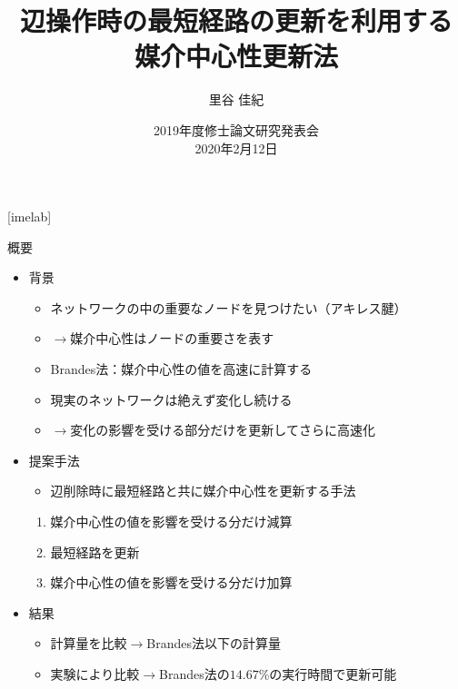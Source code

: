 \documentclass[dvipdfmx,fleqn]{beamer}
\title[媒介中心性更新法]{辺操作時の最短経路の更新を利用する \\ 媒介中心性更新法}
\author[里谷]{里谷 佳紀}
\institute[情数工研]{情報数理工学研究室}
\date[研究発表会]{2019年度修士論文研究発表会 \\ 2020年2月12日}
\begin{document}
{
  [imelab]
  \begin{frame}
    \titlepage
  \end{frame}
}

\begin{frame}{概要}
  \begin{itemize}
  \item 背景
    \begin{itemize}
    \item ネットワークの中の重要なノードを見つけたい（アキレス腱）
    \item[] $\rightarrow$\alert{媒介中心性}はノードの重要さを表す
    \item Brandes法：媒介中心性の値を高速に計算する
    \item 現実のネットワークは\alert{絶えず変化し続ける}
    \item[] $\rightarrow$変化の影響を受ける部分だけを更新してさらに高速化
    \end{itemize}
  \item 提案手法
    \begin{itemize}
    \item 辺削除時に最短経路と共に媒介中心性を更新する手法
    \end{itemize}
    \begin{enumerate}
    \item 媒介中心性の値を影響を受ける分だけ\alert{減算}
    \item \alert{最短経路を更新}
    \item 媒介中心性の値を影響を受ける分だけ\alert{加算}
    \end{enumerate}
  \item 結果
    \begin{itemize}
    \item 計算量を比較$\rightarrow$Brandes法以下の計算量
    \item 実験により比較$\rightarrow$Brandes法の$14.67\%$の実行時間で更新可能
    \end{itemize}
  \end{itemize}

\end{frame}
\end{document}
